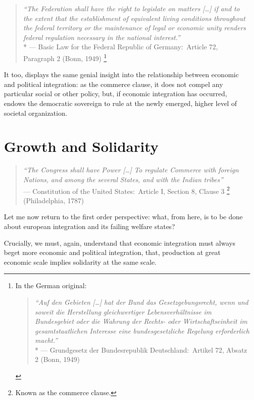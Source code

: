 \begin{quote}
	\emph{``The Federation shall have the right to legislate on matters [\ldots] if and to the extent that the establishment of equivalent living conditions throughout the federal territory or the maintenance of legal or economic unity renders federal regulation necessary in the national interest.''}\\*
	--- Basic Law for the Federal Republic of Germany:\ Article 72, Paragraph 2 (Bonn, 1949)
	\footnote{
		In the German original:
		\begin{quote}
		\emph{``Auf den Gebieten [\ldots] hat der Bund das Gesetzgebungsrecht, wenn und soweit die Herstellung gleichwertiger Lebensverhältnisse im Bundesgebiet oder die Wahrung der Rechts- oder Wirtschaftseinheit im gesamtstaatlichen Interesse eine bundesgesetzliche Regelung erforderlich macht.''}\\*
		--- Grundgesetz der Bundesrepublik Deutschland:\ Artikel 72, Absatz 2 (Bonn, 1949)
		\end{quote}
	}
\end{quote}

It too, displays the same genial insight into the relationship between economic and political integration:
as the commerce clause, it does not compel any particular social or other policy, but, if economic integration has occurred, endows the democratic sovereign to rule at the newly emerged, higher level of societal organization.


\section{Growth and Solidarity} \label{sec:growth-solidarity}

\begin{quote}
	\emph{``The Congress shall have Power [\ldots] To regulate Commerce with foreign Nations, and among the several States, and with the Indian tribes''}\\
	--- Constitution of the United States:\ Article I, Section 8, Clause 3
	\footnote{
		Known as the commerce clause.
	}
	(Philadelphia, 1787)
\end{quote}

Let me now return to the first order perspective:
what, from here, is to be done about european integration and its failing welfare states?

Crucially, we must, again, understand that economic integration must always beget more economic and political integration, that, production at great economic scale implies solidarity at the same scale.

